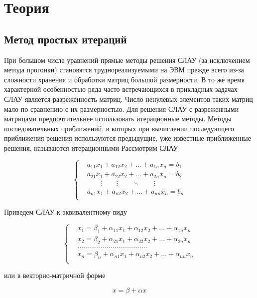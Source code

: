\section*{Теория}

\subsection*{Метод простых итераций}

При большом числе уравнений прямые методы решения СЛАУ (за исключением метода
прогонки) становятся труднореализуемыми на ЭВМ прежде всего из-за сложности хранения и
обработки матриц большой размерности. В то же время характерной особенностью ряда часто
встречающихся в прикладных задачах СЛАУ является разреженность матриц. Число ненулевых
элементов таких матриц мало по сравнению с их размерностью. Для решения СЛАУ с
разреженными матрицами предпочтительнее использовать итерационные методы. Методы
последовательных приближений, в которых при вычислении последующего приближения
решения используются предыдущие, уже известные приближенные решения, называются
итерационными
Рассмотрим СЛАУ

$$\left\{\begin{aligned}
    &a_{11}x_1 + a_{12}x_2 + \dots + a_{1n}x_n = b_1 \\
    &a_{21}x_1 + a_{22}x_2 + \dots + a_{2n}x_n = b_2 \\
    & \qquad \vdots \qquad \vdots \qquad \ddots \qquad \vdots\\
    &a_{n1}x_1 + a_{n2}x_2 + \dots + a_{nn}x_n = b_n \\
\end{aligned}\right.$$

Приведем СЛАУ к эквивалентному виду

$$\left\{\begin{aligned}
    &x_1 = \beta_1 + \alpha_{11}x_1 + \alpha_{12}x_2 + \dots + \alpha_{1n}x_n\\
    &x_2 = \beta_2 + \alpha_{21}x_1 + \alpha_{22}x_2 + \dots + \alpha_{2n}x_n\\
    &\dots\dots\dots\dots\dots\dots\dots\dots\dots\dots\dots\dots\\
    &x_n = \beta_n + \alpha_{n1}x_1 + \alpha_{n2}x_2 + \dots + \alpha_{nn}x_n\\
\end{aligned}\right.$$

или в векторно-матричной форме

$$x = \beta + \alpha x$$

